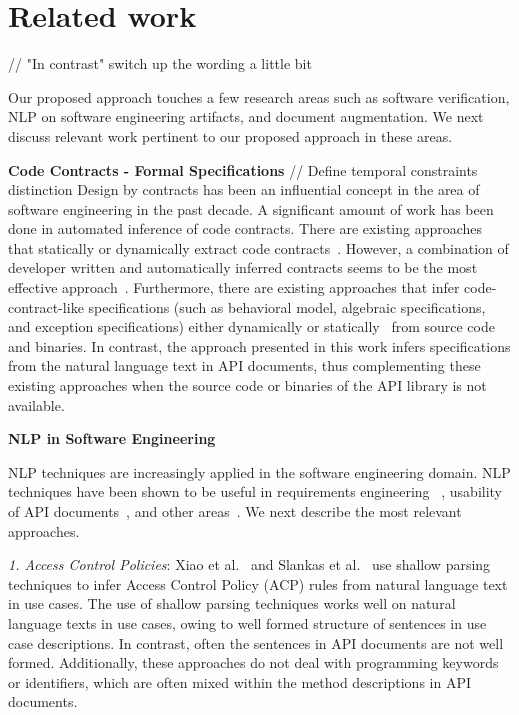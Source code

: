 \section{Related work}
\label{sec:related}

// "In contrast" switch up the wording a little bit 

Our proposed approach touches a few research areas such as software verification,  NLP on software engineering artifacts, and document augmentation. We next discuss relevant work pertinent to our proposed approach in these areas.

\textbf{Code Contracts - Formal Specifications}
// Define temporal constraints distinction
Design by contracts has been an influential concept in the area of software engineering in the past decade. A significant amount of work has been done in automated inference of code contracts. There are existing approaches that statically or dynamically extract code contracts~\cite{csallner08dysy,NimmerE02:ISSTA,Tillmann:2006:DLM:2105385.2105433}. However, a combination of developer written and automatically inferred contracts seems to be the most effective approach~\cite{Polikarpova2009ISSTA,Flanagan:2001:HAA:647540.730008}. Furthermore, there are existing approaches that infer code-contract-like specifications (such as behavioral model, algebraic specifications, and exception specifications) either dynamically\cite{Henkel07discoveringdocumentation,Ghezzi:2009:SIB:1555001.1555057,Henkel:2008:DDA:1363102.1363105} or statically~\cite{Flanagan:2001:HAA:647540.730008,Buse:2008:ADI:1390630.1390664} from source code and binaries. In contrast, the approach presented in this work infers specifications from the natural language text in API documents, thus complementing these existing approaches when the source code or binaries of the API library is not available.


\textbf{NLP in Software Engineering}

NLP techniques are increasingly applied in the software engineering domain. NLP techniques have been shown to be useful in requirements engineering ~\cite{Sinha2009,Sinha2010,Gervasi2005}, usability of API documents~\cite{Dekel2009}, and other areas~\cite{Zhou2008,Little2009,pandita13:WHYPER}. We next describe the most relevant approaches.


\textit{1. Access Control Policies}: Xiao et al.~\cite{XiaoFSE2012} and Slankas et al.~\cite{johnSlankasPASSAT13} use shallow parsing techniques to infer Access Control Policy (ACP) rules from natural language text in use cases. The use of shallow parsing techniques works well on natural language texts in use cases, owing to well formed structure of sentences in use case descriptions. In contrast, often the sentences in API documents are not well formed. Additionally, these approaches do not deal with programming keywords or identifiers, which are often mixed within the method descriptions in API documents.

